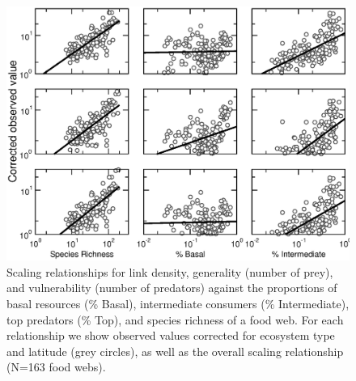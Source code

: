 \documentclass[12pt]{article}
\begin{document}
\newpage

\begin{figure}[H]
\includegraphics[width=.9\textwidth]{Figures/by_TL/scaling_with_S/proportions/fitlines_nonts.eps}
\caption{Scaling relationships for link density, generality (number of prey), 
and vulnerability (number of predators) 
against the proportions of basal resources (\% Basal), intermediate consumers (\% Intermediate), top 
predators (\% Top), and species richness of a food web. 
For each relationship we show observed values corrected for
ecosystem type and latitude (grey circles), as well as the overall scaling relationship (N=163 food webs). }
\label{props_v_lat}
\end{figure}
\end{document}

